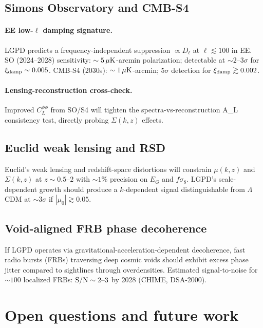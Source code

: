 \documentclass[11pt]{article}
\begin{document}
\subsection{Simons Observatory and CMB-S4}

\paragraph{EE low-$\ell$ damping signature.}
LGPD predicts a frequency-independent suppression $\propto D_\ell$ at $\ell\lesssim 100$ in EE.
SO (2024--2028) sensitivity: $\sim 5\,\mu{\rm K}$-arcmin polarization; detectable at $\sim 2\text{--}3\sigma$ for $\xi_{\rm damp}\sim 0.005$.
CMB-S4 (2030s): $\sim 1\,\mu{\rm K}$-arcmin; $5\sigma$ detection for $\xi_{\rm damp}\gtrsim 0.002$.

\paragraph{Lensing-reconstruction cross-check.}
Improved $C_L^{\phi\phi}$ from SO/S4 will tighten the spectra-vs-reconstruction A_L consistency test, directly probing $\Sigma(k,z)$ effects.

\subsection{Euclid weak lensing and RSD}

Euclid's weak lensing and redshift-space distortions will constrain $\mu(k,z)$ and $\Sigma(k,z)$ at $z\sim 0.5\text{--}2$ with $\sim 1\%$ precision on $E_G$ and $f\sigma_8$.
LGPD's scale-dependent growth should produce a $k$-dependent signal distinguishable from $\Lambda$CDM at $\sim 3\sigma$ if $|\mu_0|\gtrsim 0.05$.

\subsection{Void-aligned FRB phase decoherence}

If LGPD operates via gravitational-acceleration-dependent decoherence, fast radio bursts (FRBs) traversing deep cosmic voids should exhibit excess phase jitter compared to sightlines through overdensities.
Estimated signal-to-noise for $\sim 100$ localized FRBs: ${\rm S/N}\sim 2\text{--}3$ by 2028 (CHIME, DSA-2000).

\section{Open questions and future work}
\end{document}
